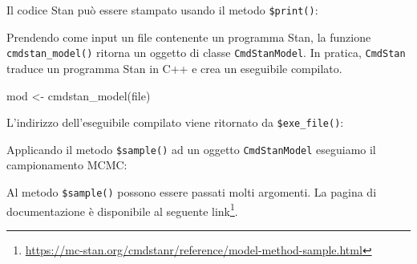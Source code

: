 \documentclass[
  11pt,
]{krantz}
\makeatletter
\newenvironment{Shaded}{\begin{snugshade}}{\end{snugshade}}
\newcommand{\AttributeTok}[1]{\textcolor[rgb]{0.61,0.61,0.61}{#1}}
\newcommand{\DecValTok}[1]{\textcolor[rgb]{0.06,0.06,0.06}{#1}}
\newcommand{\FunctionTok}[1]{\textcolor[rgb]{0,0,0}{#1}}
\newcommand{\NormalTok}[1]{#1}
\newcommand{\OtherTok}[1]{\textcolor[rgb]{0.37,0.37,0.37}{#1}}
\newcommand{\SpecialCharTok}[1]{\textcolor[rgb]{0,0,0}{#1}}
\renewcommand{\href}[2]{#2\footnote{\url{#1}}}
\newenvironment{kframe}{%
\medskip{}
\setlength{\fboxsep}{.8em}
 \def\at@end@of@kframe{}%
 \ifinner\ifhmode%
  \def\at@end@of@kframe{\end{minipage}}%
  \begin{minipage}{\columnwidth}%
 \fi\fi%
 \def\FrameCommand##1{\hskip\@totalleftmargin \hskip-\fboxsep
 \colorbox{shadecolor}{##1}\hskip-\fboxsep
     \hskip-\linewidth \hskip-\@totalleftmargin \hskip\columnwidth}%
 \MakeFramed {\advance\hsize-\width
   \@totalleftmargin\z@ \linewidth\hsize
   \@setminipage}}%
 {\par\unskip\endMakeFramed%
 \at@end@of@kframe}
\renewenvironment{Shaded}{\begin{kframe}}{\end{kframe}}
\makeatother
\begin{document}
Il codice Stan può essere stampato usando il metodo \texttt{\$print()}:

\begin{Shaded}
\end{Shaded}

Prendendo come input un file contenente un programma Stan, la funzione \texttt{cmdstan\_model()} ritorna un oggetto di classe \texttt{CmdStanModel}. In pratica, \texttt{CmdStan} traduce un programma Stan in C++ e crea un eseguibile compilato.

\begin{Shaded}
\begin{Highlighting}[]
\NormalTok{mod }\OtherTok{\textless{}{-}} \FunctionTok{cmdstan\_model}\NormalTok{(file)}
\end{Highlighting}
\end{Shaded}

L'indirizzo dell'eseguibile compilato viene ritornato da \texttt{\$exe\_file()}:

\begin{Shaded}
\end{Shaded}

Applicando il metodo \texttt{\$sample()} ad un oggetto \texttt{CmdStanModel} eseguiamo il campionamento MCMC:

\begin{Shaded}
\end{Shaded}

Al metodo \texttt{\$sample()} possono essere passati molti argomenti. La pagina di documentazione è disponibile al seguente \href{https://mc-stan.org/cmdstanr/reference/model-method-sample.html}{link}.
\end{document}
